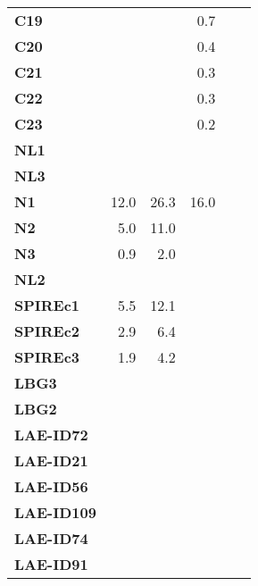 \begin{tabular}{lrrrrl}
\textbf{C19      } &           &              &      0.7 &             &        \\
\textbf{C20      } &           &              &      0.4 &             &        \\
\textbf{C21      } &           &              &      0.3 &             &        \\
\textbf{C22      } &           &              &      0.3 &             &        \\
\textbf{C23      } &           &              &      0.2 &             &        \\
\textbf{NL1      } &           &              &          &             &        \\
\textbf{NL3      } &           &              &          &             &        \\
\textbf{N1       } &      12.0 &         26.3 &     16.0 &             &        \\
\textbf{N2       } &       5.0 &         11.0 &          &             &        \\
\textbf{N3       } &       0.9 &          2.0 &          &             &        \\
\textbf{NL2      } &           &              &          &             &        \\
\textbf{SPIREc1  } &       5.5 &         12.1 &          &             &        \\
\textbf{SPIREc2  } &       2.9 &          6.4 &          &             &        \\
\textbf{SPIREc3  } &       1.9 &          4.2 &          &             &        \\
\textbf{LBG3     } &           &              &          &             &        \\
\textbf{LBG2     } &           &              &          &             &        \\
\textbf{LAE-ID72 } &           &              &          &             &        \\
\textbf{LAE-ID21 } &           &              &          &             &        \\
\textbf{LAE-ID56 } &           &              &          &             &        \\
\textbf{LAE-ID109} &           &              &          &             &        \\
\textbf{LAE-ID74 } &           &              &          &             &        \\
\textbf{LAE-ID91 } &           &              &          &             &        \\

\end{tabular}
